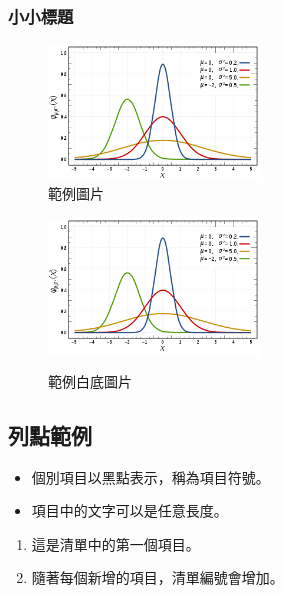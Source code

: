 \subsubsection{小小標題}

\begin{figure}[!htb]
    \centering
    \includegraphics[width=0.5\textwidth]{figures/gambar.png}
    \caption{範例圖片}
    \label{figure:fig1}
\end{figure}

\begin{figure}[!htb]
    \centering
    \colorbox{white}{\includegraphics[width=0.5\textwidth]{figures/gambar.png}}
    \caption{範例白底圖片}
    \label{figure:fig2}
\end{figure}


\subsection{列點範例}

\begin{itemize}
    \item 個別項目以黑點表示，稱為項目符號。
    \item 項目中的文字可以是任意長度。
\end{itemize}

\begin{enumerate}
    \item 這是清單中的第一個項目。
    \item 隨著每個新增的項目，清單編號會增加。
\end{enumerate}

